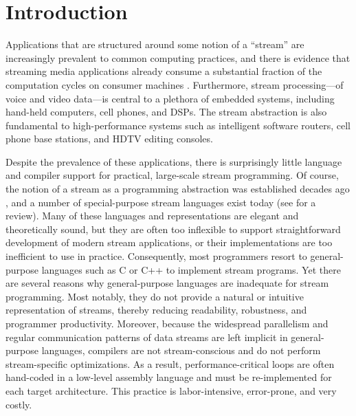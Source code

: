 \section{Introduction}

Applications that  are structured around  some notion of  a ``stream''
are increasingly prevalent to common computing practices, and there is
evidence   that  streaming  media   applications  already   consume  a
substantial fraction  of the  computation cycles on  consumer machines
\cite{Rix98}. Furthermore, stream processing---of voice and video
data---is  central  to  a  plethora  of  embedded  systems,  including
hand-held computers, cell phones,  and DSPs. The stream abstraction is
also  fundamental  to  high-performance  systems such  as  intelligent
software routers, cell phone base stations, and HDTV editing consoles.

Despite the  prevalence of  these applications, there  is surprisingly
little language and compiler support for practical, large-scale stream
programming.   Of course,  the notion  of  a stream  as a  programming
abstraction was  established decades ago \cite{SICP}, and  a number of
special-purpose stream languages  exist today (see \cite{survey97} for
a review).   Many of these  languages and representations  are elegant
and theoretically sound, but they  are often too inflexible to support
straightforward  development of modern  stream applications,  or their
implementations are too inefficient to use in practice.  Consequently,
most programmers resort to general-purpose  languages such as C or C++
to  implement  stream programs.  Yet  there  are  several reasons  why
general-purpose languages are  inadequate for stream programming. Most
notably, they do not provide  a natural or intuitive representation of
streams,  thereby  reducing  readability, robustness,  and  programmer
productivity.   Moreover,  because   the  widespread  parallelism  and
regular communication  patterns of data  streams are left  implicit in
general-purpose languages,  compilers are not  stream-conscious and do
not   perform    stream-specific   optimizations.    As    a   result,
performance-critical  loops  are   often  hand-coded  in  a  low-level
assembly  language   and  must  be  re-implemented   for  each  target
architecture.  This practice is labor-intensive, error-prone, and very
costly. 

